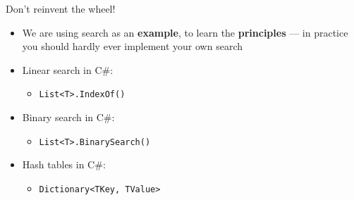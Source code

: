 \begin{frame}[fragile]{Don't reinvent the wheel!}
	\begin{itemize}
		\pause\item We are using search as an \textbf{example}, to learn the \textbf{principles} --- in practice
			you should hardly ever implement your own search
		\pause\item Linear search in C\#:
			\begin{itemize}
				\pause\item \lstinline{List<T>.IndexOf()}
			\end{itemize}
		\pause\item Binary search in C\#:
			\begin{itemize}
				\pause\item \lstinline{List<T>.BinarySearch()}
			\end{itemize}
		\pause\item Hash tables in C\#:
			\begin{itemize}
				\pause\item \lstinline{Dictionary<TKey, TValue>}
			\end{itemize}
	\end{itemize}
\end{frame}
